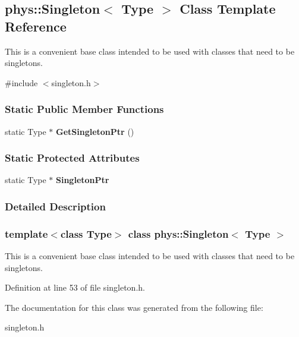 \hypertarget{classphys_1_1Singleton}{
\subsection{phys::Singleton$<$ Type $>$ Class Template Reference}
\label{d9/d64/classphys_1_1Singleton}
}


This is a convenient base class intended to be used with classes that need to be singletons.  




{\ttfamily \#include $<$singleton.h$>$}

\subsubsection*{Static Public Member Functions}
\begin{DoxyCompactItemize}
\item 
\hypertarget{classphys_1_1Singleton_a85abc4799733f13dea8b1e737b54c6fd}{
static Type $\ast$ {\bfseries GetSingletonPtr} ()}
\label{d9/d64/classphys_1_1Singleton_a85abc4799733f13dea8b1e737b54c6fd}

\end{DoxyCompactItemize}
\subsubsection*{Static Protected Attributes}
\begin{DoxyCompactItemize}
\item 
\hypertarget{classphys_1_1Singleton_a1be84eb8cb714e0456fa74ad4a123031}{
static Type $\ast$ {\bfseries SingletonPtr}}
\label{d9/d64/classphys_1_1Singleton_a1be84eb8cb714e0456fa74ad4a123031}

\end{DoxyCompactItemize}


\subsubsection{Detailed Description}
\subsubsection*{template$<$class Type$>$ class phys::Singleton$<$ Type $>$}

This is a convenient base class intended to be used with classes that need to be singletons. 

Definition at line 53 of file singleton.h.



The documentation for this class was generated from the following file:\begin{DoxyCompactItemize}
\item 
singleton.h\end{DoxyCompactItemize}
